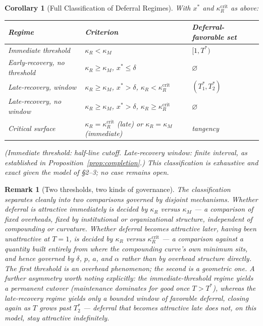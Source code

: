 \documentclass[11pt]{article}
\newtheorem{corollary}[definition]{Corollary}
\newtheorem*{remark}{Remark}
\begin{document}
\begin{corollary}[Full Classification of Deferral Regimes]
\label{cor:classification}
With $x^*$ and $\kappa_R^{\mathrm{crit}}$ as above:
\begin{center}
\small
\begin{tabular}{p{3.1cm}p{4.6cm}p{2.6cm}}
\textbf{Regime} & \textbf{Criterion} & \textbf{Deferral-favorable set} \\
\hline
Immediate threshold & $\kappa_R < \kappa_M$ & $[1,T^*)$ \\
Early-recovery, no threshold & $\kappa_R \geq \kappa_M$, $x^*\leq\delta$ & $\varnothing$ \\
Late-recovery, window & $\kappa_R\geq\kappa_M$, $x^*>\delta$, $\kappa_R<\kappa_R^{\mathrm{crit}}$ & $(T_1^*,T_2^*)$ \\
Late-recovery, no window & $\kappa_R\geq\kappa_M$, $x^*>\delta$, $\kappa_R\geq\kappa_R^{\mathrm{crit}}$ & $\varnothing$ \\
Critical surface & $\kappa_R=\kappa_R^{\mathrm{crit}}$ (late) or $\kappa_R=\kappa_M$ (immediate) & tangency \\
\end{tabular}
\end{center}
\noindent(Immediate threshold: half-line cutoff. Late-recovery window: finite interval, as established in Proposition~\ref{prop:completion}.)
This classification is exhaustive and exact given the model of \S 2--3; no case remains open.
\end{corollary}

\begin{remark}[Two thresholds, two kinds of governance]
The classification separates cleanly into two comparisons governed by disjoint mechanisms. Whether deferral is attractive \emph{immediately} is decided by $\kappa_R$ versus $\kappa_M$ — a comparison of fixed overheads, fixed by institutional or organizational structure, independent of compounding or curvature. Whether deferral becomes attractive \emph{later}, having been unattractive at $T=1$, is decided by $\kappa_R$ versus $\kappa_R^{\mathrm{crit}}$ — a comparison against a quantity built entirely from where the compounding curve's own minimum sits, and hence governed by $\delta$, $p$, $a$, and $\alpha$ rather than by overhead structure directly. The first threshold is an overhead phenomenon; the second is a geometric one. A further asymmetry worth noting explicitly: the immediate-threshold regime yields a permanent cutover (maintenance dominates for good once $T>T^*$), whereas the late-recovery regime yields only a bounded window of favorable deferral, closing again as $T$ grows past $T_2^*$ — deferral that becomes attractive late does not, on this model, stay attractive indefinitely.
\end{remark}
\end{document}
